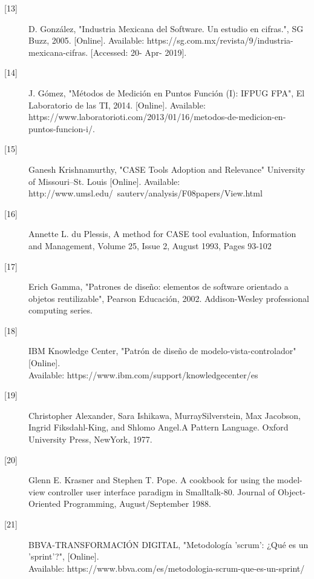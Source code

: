 \begin{description}
		\item[\hypertarget{b13}{[13]}] D. González, "Industria Mexicana del Software. Un estudio en cifras.", SG Buzz, 2005. [Online]. Available: https://sg.com.mx/revista/9/industria-mexicana-cifras. [Accessed: 20- Apr- 2019].
		
		\item[\hypertarget{b14}{[14]}] J. Gómez, "Métodos de Medición en Puntos Función (I): IFPUG FPA", El Laboratorio de las TI, 2014. [Online]. Available: https://www.laboratorioti.com/2013/01/16/metodos-de-medicion-en-puntos-funcion-i/. 
		
		\item[\hypertarget{b15}{[15]}] Ganesh Krishnamurthy, "CASE Tools 
		Adoption and Relevance" University of Missouri–St. Louis [Online]. Available: http://www.umsl.edu/~sauterv/analysis/F08papers/View.html
		
		\item[\hypertarget{b16}{[16]}] Annette L. du Plessis, A method for CASE tool evaluation, Information and Management, Volume 25, Issue 2, August 1993, Pages 93-102
		
		\item[\hypertarget{b17}{[17]}]	Erich Gamma, "Patrones de diseño: elementos de software orientado a objetos reutilizable", Pearson Educación, 2002. Addison-Wesley professional computing series.
		
		\item[\hypertarget{b18}{[18]}] IBM Knowledge Center, "Patrón de diseño de modelo-vista-controlador" [Online].\\ Available: https://www.ibm.com/support/knowledgecenter/es
		
		\item[\hypertarget{b19}{[19]}] Christopher Alexander, Sara Ishikawa, MurraySilverstein, Max Jacobson,
		Ingrid Fiksdahl-King, and Shlomo Angel.A Pattern Language. Oxford University
		Press, NewYork, 1977.
		
		\item[\hypertarget{b20}{[20]}] Glenn E. Krasner and Stephen T. Pope. A cookbook for using the model-view
		controller user interface paradigm in Smalltalk-80. Journal of Object-Oriented Programming, August/September 1988.
		
		\item[\hypertarget{b21}{[21]}] BBVA-TRANSFORMACIÓN DIGITAL, "Metodología 'scrum': ¿Qué es un 'sprint'?", [Online].\\ Available: https://www.bbva.com/es/metodologia-scrum-que-es-un-sprint/
		

\end{description}
